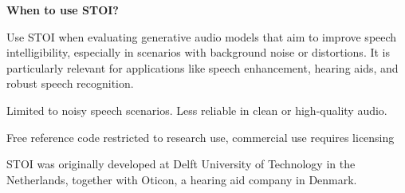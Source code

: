 \textbf{When to use STOI?}

Use STOI when evaluating generative audio models that aim to improve speech intelligibility, especially in scenarios with background noise
or distortions. It is particularly relevant for applications like speech enhancement, hearing aids, and robust speech recognition.

{
\item Limited to noisy speech scenarios. Less reliable in clean or high-quality audio.
\item Free reference code restricted to research use, commercial use requires licensing
}

\clearpage

\thispagestyle{customstyle}

{STOI was originally developed at Delft University of Technology in the Netherlands, together with Oticon, a hearing aid company in Denmark.}